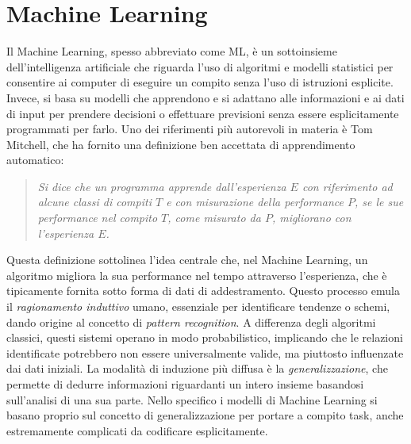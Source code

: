 \documentclass[12pt,a4paper,twoside,openright]{book}
\begin{document}
\section{Machine Learning}
Il Machine Learning, spesso abbreviato come ML, è un sottoinsieme dell'intelligenza artificiale che riguarda l'uso di algoritmi e modelli statistici per consentire ai computer di eseguire un compito senza l'uso di istruzioni esplicite. Invece, si basa su modelli che apprendono e si adattano alle informazioni e ai dati di input per prendere decisioni o effettuare previsioni senza essere esplicitamente programmati per farlo.
Uno dei riferimenti più autorevoli in materia è Tom Mitchell, che ha fornito una definizione ben accettata di apprendimento automatico\cite{DBLP:books/daglib/0087929}:

\begin{quote}
    \emph{
    Si dice che un programma apprende dall'esperienza $E$ con riferimento ad alcune classi di compiti $T$ e con misurazione della performance $P$, se le sue performance nel compito $T$, come misurato da $P$, migliorano con l'esperienza $E$.}
\end{quote}

Questa definizione sottolinea l'idea centrale che, nel Machine Learning, un algoritmo migliora la sua performance nel tempo attraverso l'esperienza, che è tipicamente fornita sotto forma di dati di addestramento.
Questo processo emula il \emph{ragionamento induttivo} umano, essenziale per identificare tendenze o schemi, dando origine al concetto di \emph{pattern recognition}. A differenza degli algoritmi classici, questi sistemi operano in modo probabilistico, implicando che le relazioni identificate potrebbero non essere universalmente valide, ma piuttosto influenzate dai dati iniziali. La modalità di induzione più diffusa è la \emph{generalizzazione}, che permette di dedurre informazioni riguardanti un intero insieme basandosi sull'analisi di una sua parte.
Nello specifico i modelli di Machine Learning si basano proprio sul concetto di generalizzazione per portare a compito task, anche estremamente complicati da codificare esplicitamente. 
\end{document}
